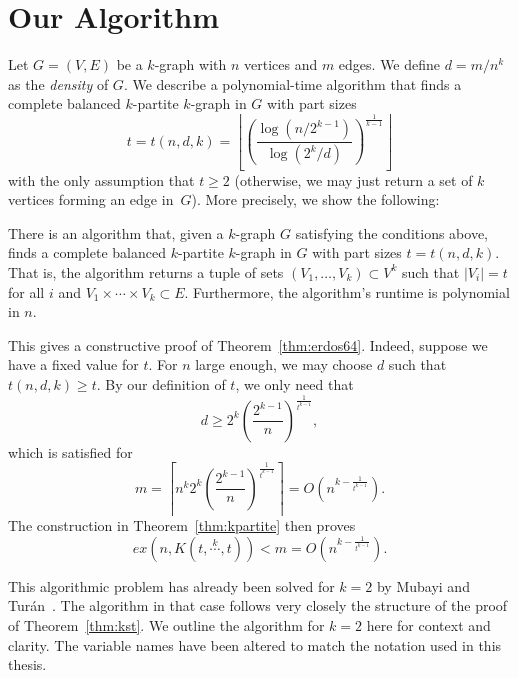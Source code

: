 \section{Our Algorithm}\label{sec:algorithm}
Let $G = (V, E)$ be a $k$-graph with $n$ vertices and $m$ edges.
We define $d = m/n^k$ as the \emph{density} of $G$.
We describe a polynomial-time algorithm that finds a complete balanced $k$-partite $k$-graph in $G$ with part
sizes
\begin{equation}
     t = t (n, d, k) = \left\lfloor
        \left(  \frac{\log (n/2^{k-1})}{\log (2^{k}/d)} \right)
        ^{\frac{1}{k-1}} \right\rfloor \label{eq:t}
\end{equation}
with the only assumption that $t \geq 2$ (otherwise, we may just return a set of $k$ vertices forming an edge in~$G$).
More precisely, we show the following:
\begin{theorem}\label{thm:kpartite}
    There is an algorithm that, given a $k$-graph $G$ satisfying the conditions above,
    finds a complete balanced $k$-partite $k$-graph in $G$ with part sizes $t = t(n, d, k)$.
    That is, the algorithm returns a tuple of sets $(V_1, \ldots, V_k) \subset V^k$ such that
    $|V_i| = t$ for all $i$ and $V_1 \times \cdots \times V_k \subset E$.
    Furthermore, the algorithm's runtime is polynomial in $n$.
\end{theorem}

\begin{remark}
    This gives a constructive proof of Theorem~\ref{thm:erdos64}.
    Indeed, suppose we have a fixed value for $t$.
    For $n$ large enough, we may choose $d$ such that $t(n, d, k) \geq t$.
    By our definition of $t$, we only need that
    \[
        d \geq 2^{k} {\left( \frac{2^{k-1}}{n}\right)}^{\frac{1}{t^{k-1}}},
    \]
    which is satisfied for
    \[
        m =
        \left\lceil
        n^k 2^{k} {\left( \frac{2^{k-1}}{n}\right)}^{\frac{1}{t^{k-1}}}
        \right\rceil =
        O\left(n^{k - \frac{1}{t^{k-1}}}\right).
    \]
    The construction in Theorem~\ref{thm:kpartite} then proves
    \[
        ex(n, K(t, \overset{k}{\cdots}, t)) < m =  O\left(n^{k - \frac{1}{t^{k-1}}}\right).
    \]
\end{remark}


This algorithmic problem has already been solved for $k = 2$ by Mubayi and Turán~\cite{MUBAYI2010174}.
The algorithm in that case follows very closely the structure of the proof of Theorem~\ref{thm:kst}.
We outline the algorithm for $k = 2$ here for context and clarity.
The variable names have been altered to match the notation used in this thesis.

